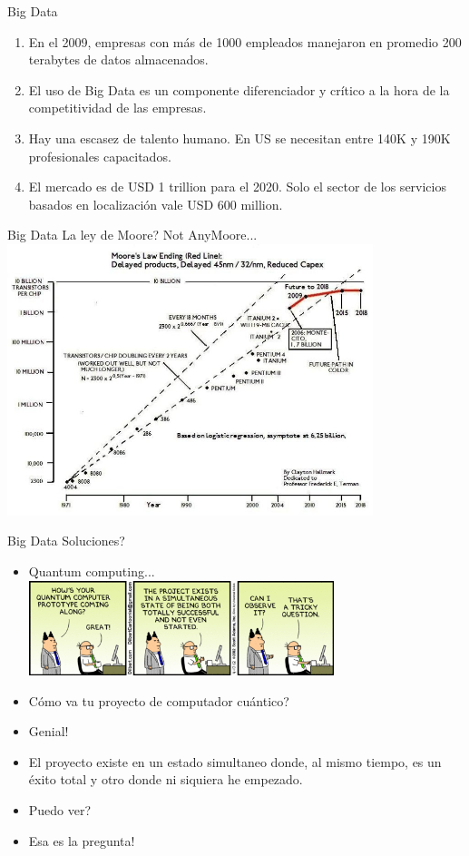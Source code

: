 \documentclass{beamer}
\begin{document}
\begin{frame}{Big Data}
    \begin{enumerate}
        \item En el 2009, empresas con más de 1000 empleados manejaron en promedio 200 terabytes de datos almacenados.
        \item El uso de Big Data es un componente diferenciador y crítico a la hora de la competitividad de las empresas.
        \item Hay una escasez de talento humano.  En US se necesitan entre 140K y 190K profesionales capacitados.
        \item El mercado es de USD 1 trillion para el 2020.  Solo el sector de los servicios basados en localización vale USD 600 million.
    \end{enumerate}
\end{frame}

\begin{frame}{Big Data}
    La ley de Moore? Not AnyMoore...
  \centering
  \includegraphics[width=0.8\textwidth]{figures/moore}
\end{frame}

\begin{frame}{Big Data}
    Soluciones?
    \begin{itemize}
        \item Quantum computing... \\
        \includegraphics[width=0.7\textwidth]{figures/quantum} 
    \end{itemize}
    {\tiny 
        \begin{itemize}
         \item Cómo va tu proyecto de computador cuántico?
         \item Genial!
         \item El proyecto existe en un estado simultaneo donde, al mismo tiempo, es un éxito total y otro donde ni siquiera he empezado.
         \item Puedo ver?
         \item Esa es la pregunta!
        \end{itemize}
    }
\end{frame}
\end{document}
